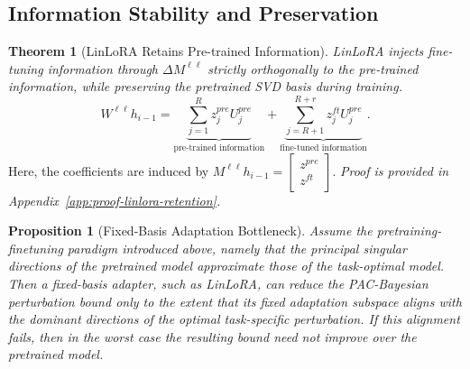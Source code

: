 \documentclass{article}
\begin{document}
\subsection{Information Stability and Preservation}

\noindent \textbf{Theorem 1} (LinLoRA Retains Pre-trained Information).
\textit{
LinLoRA injects fine-tuning information through $\Delta M^{\ell \ell}$
strictly orthogonally to the pre-trained information, while preserving the
pretrained SVD basis during training.
}
\[
W^{\ell \ell}h_{i-1}
=
\underbrace{\sum\limits_{j=1}^{R} z^{pre}_j U^{pre}_j}_{\text{pre-trained information}}
+
\underbrace{\sum\limits_{j=R+1}^{R+r} z^{ft}_j U^{pre}_j}_{\text{fine-tuned information}} .
\]
Here, the coefficients are induced by $M^{\ell \ell}h_{i-1}
=
\begin{bmatrix}
z^{pre} \\
z^{ft}
\end{bmatrix}
$. \textit{Proof is provided in Appendix~\ref{app:proof-linlora-retention}.}

\noindent \textbf{Proposition 1} (Fixed-Basis Adaptation Bottleneck). \textit {Assume the pretraining-finetuning paradigm introduced above, namely that the principal singular directions of the pretrained model approximate those of the task-optimal model. Then a fixed-basis adapter, such as LinLoRA, can reduce the PAC-Bayesian perturbation bound only to the extent that its fixed adaptation subspace aligns with the dominant directions of the optimal task-specific perturbation. If this alignment fails, then in the worst case the resulting bound need not improve over the pretrained model.}
\end{document}
